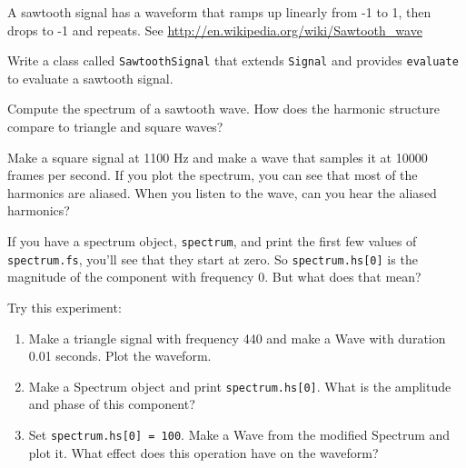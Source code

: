 \documentclass[12pt]{book}
\begin{document}
\begin{exercise}
A sawtooth signal has a waveform that ramps up linearly from -1 to 1,
then drops to -1 and repeats. See
\url{http://en.wikipedia.org/wiki/Sawtooth_wave}

Write a class called
{\tt SawtoothSignal} that extends {\tt Signal} and provides
{\tt evaluate} to evaluate a sawtooth signal.

Compute the spectrum of a sawtooth wave.  How does the harmonic
structure compare to triangle and square waves?
\end{exercise}

\begin{exercise}
Make a square signal at 1100 Hz and make a wave that samples it
at 10000 frames per second.  If you plot the spectrum, you can
see that most of the harmonics are aliased.
When you listen to the wave, can you hear the aliased harmonics?
\end{exercise}


\begin{exercise}
If you have a spectrum object, {\tt spectrum}, and print the
first few values of {\tt spectrum.fs}, you'll see that they
start at zero.  So {\tt spectrum.hs[0]} is the magnitude
of the component with frequency 0.  But what does that mean?

Try this experiment:

\begin{enumerate}

\item Make a triangle signal with frequency 440 and make
a Wave with duration 0.01 seconds.  Plot the waveform.

\item Make a Spectrum object and print {\tt spectrum.hs[0]}.
What is the amplitude and phase of this component?

\item Set {\tt spectrum.hs[0] = 100}.  Make a Wave from the
modified Spectrum and plot it.  What effect does this operation
have on the waveform?

\end{enumerate}

\end{exercise}
\end{document}
